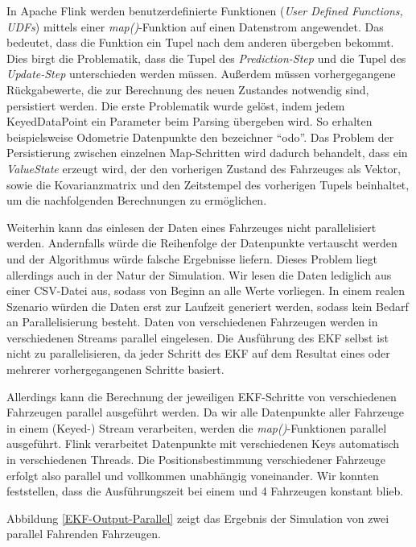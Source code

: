 \documentclass[11pt]{article}
\begin{document}
In Apache Flink werden benutzerdefinierte Funktionen (\textit{User Defined Functions, UDFs}) mittels einer \textit{map()}-Funktion auf einen Datenstrom angewendet. Das bedeutet, dass die Funktion ein Tupel nach dem anderen übergeben bekommt. Dies birgt die Problematik, dass die Tupel des \textit{Predict\-ion-Step} und die Tupel des \textit{Update-Step} unterschieden werden müssen. Außerdem  müssen vorhergegangene Rückgabewerte, die zur Berechnung des neuen Zustandes notwendig sind, persistiert werden. Die erste Problematik wurde gelöst, indem jedem KeyedDataPoint ein Parameter beim Parsing übergeben wird. So erhalten beispielsweise Odometrie Datenpunkte den bezeichner “odo”. Das Problem der Persistierung zwischen einzelnen Map-Schritten wird dadurch behandelt, dass ein \textit{ValueState} erzeugt wird, der den vorherigen Zustand des Fahrzeuges als Vektor, sowie die Kovarianzmatrix und den Zeitstempel des vorherigen Tupels beinhaltet, um die nachfolgenden Berechnungen zu ermöglichen.

Weiterhin kann das einlesen der Daten eines Fahrzeuges nicht parallelisiert werden. Andernfalls würde die Reihenfolge der Datenpunkte vertauscht werden und der Algorithmus würde falsche Ergebnisse liefern. Dieses Problem liegt allerdings auch in der Natur der Simulation. Wir lesen die Daten lediglich aus einer CSV-Datei aus, sodass von Beginn an alle Werte vorliegen. In einem realen Szenario würden die Daten erst zur Laufzeit generiert werden, sodass kein Bedarf an Parallelisierung besteht. Daten von verschiedenen Fahrzeugen werden in verschiedenen Streams parallel eingelesen. Die Ausführung des EKF selbst ist nicht zu parallelisieren, da jeder Schritt des EKF auf dem Resultat eines oder mehrerer vorhergegangenen Schritte basiert.

Allerdings kann die Berechnung der jeweiligen EKF-Schritte von verschiedenen Fahrzeugen parallel ausgeführt werden. Da wir alle Datenpunkte aller Fahrzeuge in einem (Keyed-) Stream verarbeiten, werden die \textit{map()}-Funktionen parallel ausgeführt. Flink verarbeitet Datenpunkte mit verschiedenen Keys automatisch in verschiedenen Threads. Die Positionsbestimmung verschiedener Fahrzeuge erfolgt also parallel und vollkommen unabhängig voneinander. Wir konnten feststellen, dass die Ausführungszeit bei einem und 4 Fahrzeugen konstant blieb.

Abbildung \ref{EKF-Output-Parallel} zeigt das Ergebnis der Simulation von zwei parallel Fahrenden Fahrzeugen.
\end{document}
